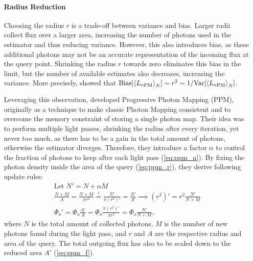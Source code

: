 \paragraph{Radius Reduction}
Choosing the radius $r$ is a trade-off between variance and bias.
Larger radii collect flux over a larger area, increasing the number of photons used in the estimator and thus reducing variance.
However, this also introduces bias, as these additional photons may not be an accurate representation of the incoming flux at the query point.
Shrinking the radius $r$ towards zero eliminates this bias in the limit, but the number of available estimates also decreases, increasing the variance.
More precisely, \textcite{knaus2011} showed that $\mathrm{Bias}\left[\estimator{{L_o}_\mathrm{PM}}\right] \sim r^2 \sim 1/\mathrm{Var}\left[\estimator{{L_o}_\mathrm{PM}}\right]$.

Leveraging this observation, \textcite{hachisuka2008} developed Progressive Photon Mapping (PPM), originally as a technique to make classic Photon Mapping consistent and to overcome the memory constraint of storing a single photon map.
Their idea was to perform multiple light passes, shrinking the radius after every iteration, yet never too much, as there has to be a gain in the total amount of photons, otherwise the estimator diverges.
Therefore, they introduce a factor $\alpha$ to control the fraction of photons to keep after each light pass (\ref{eq:ppm_n}).
By fixing the photon density inside the area of the query (\ref{eq:ppm_r}), they derive following update rules:
\begin{subequations}
\begin{align}
    \text{Let } N' = N + \alpha M \label{eq:ppm_n}\\
    \frac{N + M}{A} = \frac{N + M}{\pi r^2} \stackrel{!}{=} \frac{N'}{\pi (r^2)'} = \frac{N'}{A'} \implies (r^2)' = r^2 \frac{N'}{N + M} \label{eq:ppm_r}\\
    \Phi_o' = \Phi_o \frac{A'}{A} = \Phi_o \frac{\pi (r^2)'}{\pi r^2} = \Phi_o \frac{N'}{N + M}, \label{eq:ppm_f}
\end{align}
\end{subequations}
where $N$ is the total amount of collected photons, $M$ is the number of new photons found during the light pass, and $r$ and $A$ are the respective radius and area of the query.
The total outgoing flux has also to be scaled down to the reduced area $A'$ (\ref{eq:ppm_f}).

